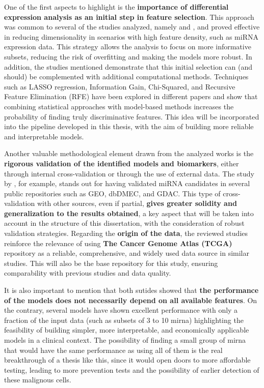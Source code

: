One of the first aspects to highlight is the \textbf{importance of differential
  expression analysis as an initial step in feature selection}. This approach was
common to several of the studies analyzed, namely
\textcite{bca_subtypes_with_ml_Wu_2021} and \textcite{ml_gastric_Azari2023},
and proved effective in reducing dimensionality in scenarios with high feature
density, such as miRNA expression data. This strategy allows the analysis to
focus on more informative subsets, reducing the risk of overfitting and making
the models more robust. In addition, the studies mentioned demonstrate that
this initial selection can (and should) be complemented with additional
computational methods. Techniques such as LASSO regression, Information Gain,
Chi-Squared, and Recursive Feature Elimination (RFE) have been explored in
different papers and show that combining statistical approaches with
model-based methods increases the probability of finding truly discriminative
features. This idea will be incorporated into the pipeline developed in this
thesis, with the aim of building more reliable and interpretable models.

Another valuable methodological element drawn from the analyzed works is the
\textbf{rigorous validation of the identified models and biomarkers}, either
through internal cross-validation or through the use of external data. The
study by \textcite{ml_gastric_Azari2023}, for example, stands out for having
validated miRNA candidates in several public repositories such as GEO, dbDMEC,
and GDAC. This type of cross-validation with other sources, even if partial,
\textbf{gives greater solidity and generalization to the results obtained}, a
key aspect that will be taken into account in the structure of this
dissertation, with the consideration of robust validation strategies. Regarding
the \textbf{origin of the data}, the reviewed studies reinforce the relevance
of using \textbf{The Cancer Genome Atlas (TCGA)} repository as a reliable,
comprehensive, and widely used data source in similar studies. This will also
be the base repository for this study, ensuring comparability with previous
studies and data quality.

It is also important to mention that both sutides showed that \textbf{the
  performance of the models does not necessarily depend on all available
  features}. On the contrary, several models have shown excellent performance
with only a fraction of the input data (such as subsets of 3 to 10 \gls{mirna})
highlighting the feasibility of building simpler, more interpretable, and
economically applicable models in a clinical context. The possibility of
finding a small group of \gls{mirna} that would have the same performance as
using all of them is the real breakthrough of a thesis like this, since it
would open doors to more affordable testing, leading to more prevention tests
and the possibility of earlier detection of these malignous cells.

